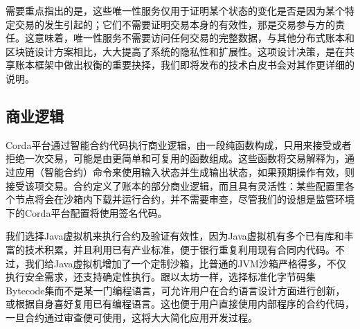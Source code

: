 \documentclass[UTF8]{ctexart}
\begin{document}
需要重点指出的是，这些唯一性服务仅用于证明某个状态的变化是否是因为某个特定交易的发生引起的；它们不需要证明交易本身的有效性，那是交易参与方的责任。这意味着，唯一性服务不需要访问任何交易的完整数据，与其他分布式账本和区块链设计方案相比，大大提高了系统的隐私性和扩展性。这项设计决策，是在共享账本框架中做出权衡的重要抉择，我们即将发布的技术白皮书会对其作更详细的说明。

\subsection{商业逻辑}
Corda平台通过智能合约代码执行商业逻辑，由一段纯函数构成，只用来接受或者拒绝一次交易，可能是由更简单和可复用的函数组成。这些函数将交易解释为，通过应用（智能合约）命令来使用输入状态并生成输出状态，如果预期操作有效，则接受该项交易。合约定义了账本的部分商业逻辑，而且具有灵活性：某些配置里各个节点将会在沙箱内下载并运行合约，并不需要审查，尽管我们的设想是监管环境下的Corda平台配置将使用签名代码。 

我们选择Java虚拟机\cite{JVM}来执行合约及验证有效性，因为Java虚拟机有多个已有库和丰富的技术积累，并且利用已有产业标准，便于银行重复利用现有合同内代码。不过，我们给Java虚拟机增加了一个定制沙箱，比普通的JVM沙箱严格得多，不仅执行安全需求，还支持确定性执行。跟以太坊\cite{Ethereum}一样，选择标准化字节码集Bytecode集而不是某一门编程语言，可允许用户在合约语言设计方面进行创新，或根据自身喜好复用已有编程语言。这也便于用户直接使用内部程序的合约代码，一旦合约通过审查便可使用，这将大大简化应用开发过程。
\end{document}
